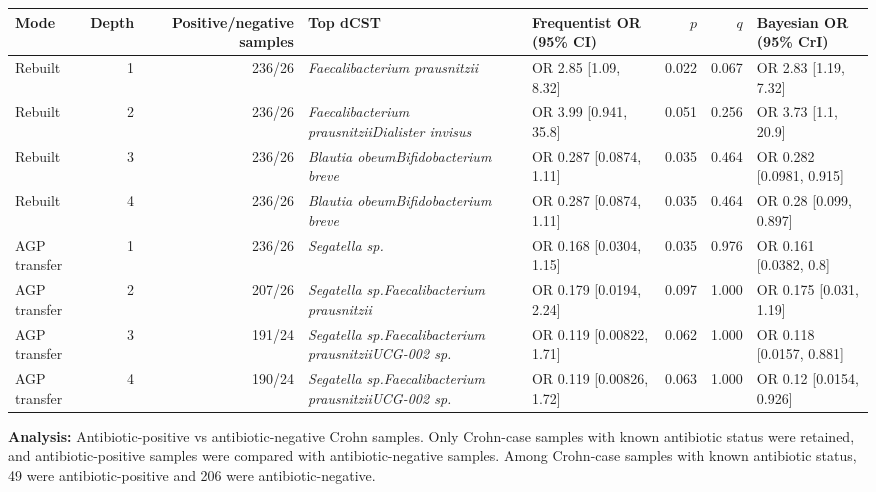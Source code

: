 \begin{center}
\scriptsize
\begin{tabularx}{\textwidth}{@{} l r r Y Y r r Y @{}}
\toprule
Mode & Depth & Positive/negative samples & Top dCST & Frequentist OR (95\% CI) & \(p\) & \(q\) & Bayesian OR (95\% CrI) \\
\midrule
Rebuilt & 1 & 236/26 & \emph{Faecalibacterium prausnitzii} & OR 2.85 [1.09, 8.32] & 0.022 & 0.067 & OR 2.83 [1.19, 7.32] \\
Rebuilt & 2 & 236/26 & \emph{Faecalibacterium prausnitzii}\dcstsep \emph{Dialister invisus} & OR 3.99 [0.941, 35.8] & 0.051 & 0.256 & OR 3.73 [1.1, 20.9] \\
Rebuilt & 3 & 236/26 & \emph{Blautia obeum}\dcstsep \emph{Bifidobacterium breve} & OR 0.287 [0.0874, 1.11] & 0.035 & 0.464 & OR 0.282 [0.0981, 0.915] \\
Rebuilt & 4 & 236/26 & \emph{Blautia obeum}\dcstsep \emph{Bifidobacterium breve} & OR 0.287 [0.0874, 1.11] & 0.035 & 0.464 & OR 0.28 [0.099, 0.897] \\
AGP transfer & 1 & 236/26 & \emph{Segatella sp.} & OR 0.168 [0.0304, 1.15] & 0.035 & 0.976 & OR 0.161 [0.0382, 0.8] \\
AGP transfer & 2 & 207/26 & \emph{Segatella sp.}\dcstsep \emph{Faecalibacterium prausnitzii} & OR 0.179 [0.0194, 2.24] & 0.097 & 1.000 & OR 0.175 [0.031, 1.19] \\
AGP transfer & 3 & 191/24 & \emph{Segatella sp.}\dcstsep \emph{Faecalibacterium prausnitzii}\dcstsep \emph{UCG-002 sp.} & OR 0.119 [0.00822, 1.71] & 0.062 & 1.000 & OR 0.118 [0.0157, 0.881] \\
AGP transfer & 4 & 190/24 & \emph{Segatella sp.}\dcstsep \emph{Faecalibacterium prausnitzii}\dcstsep \emph{UCG-002 sp.} & OR 0.119 [0.00826, 1.72] & 0.063 & 1.000 & OR 0.12 [0.0154, 0.926] \\
\bottomrule
\end{tabularx}
\end{center}
\bigskip

\noindent\textbf{Analysis:} Antibiotic-positive vs antibiotic-negative Crohn samples. Only Crohn-case samples with known antibiotic status were retained, and antibiotic-positive samples were compared with antibiotic-negative samples. Among Crohn-case samples with known antibiotic status, 49 were antibiotic-positive and 206 were antibiotic-negative.

